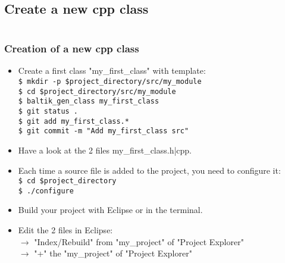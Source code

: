 \documentclass[10pt, hyperref={unicode=true,pdfusetitle, bookmarks=true,bookmarksnumbered=false,bookmarksopen=false, breaklinks=false,pdfborder={0 0 1},backref=true,colorlinks=true,linkcolor=darkblue,pageanchor, urlcolor=darkblue}]{beamer}
\begin{document}
\subsection{{\bf{Create a new cpp class}}}
\begin{frame}
\begin{columns}[c] 
\tableofcontents[sections={1-3},currentsection, currentsubsection]
\tableofcontents[sections={4-8},currentsection, currentsubsection]
\end{columns}
\end{frame}
\begin{frame}
\frametitle{Creation of a new cpp class}
\begin{block}{}
\begin{itemize}
\item Create a first class "my\_first\_class" with template:\\
\texttt{\$ mkdir -p \$project\_directory/src/my\_module}\\
\texttt{\$ cd \$project\_directory/src/my\_module}\\
\texttt{\$ baltik\_gen\_class my\_first\_class}\\
\texttt{\$ git status .}\\
\texttt{\$ git add my\_first\_class.*}\\
\texttt{\$ git commit -m "Add my\_first\_class src"}\\

\item Have a look at the 2 files my\_first\_class.h|cpp.\\

\item Each time a source file is added to the project, you need to configure it:\\
\texttt{\$ cd \$project\_directory}\\
\texttt{\$ ./configure}\\

\item Build your project with Eclipse or in the terminal.\\

\item Edit the 2 files in Eclipse:\\
$\rightarrow$ "Index/Rebuild" from "my\_project" of "Project Explorer"\\
$\rightarrow$ "+" the "my\_project" of "Project Explorer"\\
\end{itemize}
\end{block}
\end{frame}
\end{document}
